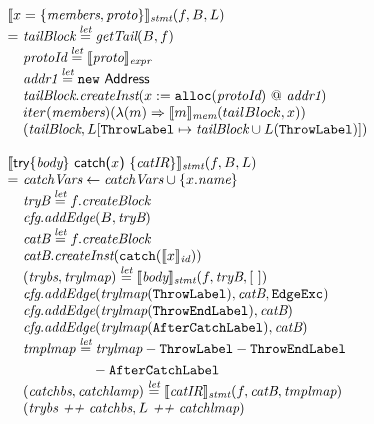 \[\begin{array}{l@{}l@{~}l}
\lefteqn{\transfun{\irobject{x}{\emph{members}, \emph{proto}}}_{\emph{stmt}}(f, B, L)}\\
& = & \emph{tailBlock} \letval \getTail(B, f)\\
& & \emph{protoId} \letval \transfun{\emph{proto}}_{\emph{expr}}\\
& & \emph{addr1} \letval \new\ \Address\\
& & \emph{tailBlock}.\emph{createInst}(x := \TT{alloc}(\emph{protoId}) ~@~ \emph{addr1})\\
& & iter(\emph{members})(\lambda(m) \Rightarrow \transfun{m}_{\emph{mem}}(tailBlock, x))\\
& & (\emph{tailBlock}, L[\ThrowLabel \mapsto \emph{tailBlock} \cup L(\ThrowLabel)])\\
& & \\

\lefteqn{\transfun{\ircfgtrycat{\emph{body}}{x}{\emph{catIR}}}_{\emph{stmt}}(f, B, L)}\\
& = & \emph{catchVars} \leftarrow \emph{catchVars} \cup \{ x.\emph{name} \}\\
& & \emph{tryB} \letval f.\emph{createBlock}\\
& & \emph{cfg}.\emph{addEdge}(B, \emph{tryB})\\
& & \emph{catB} \letval f.\emph{createBlock}\\
& & \emph{catB}.\emph{createInst}(\TT{catch}(\transfun{x}_{\emph{id}}))\\
& & (\emph{trybs}, \emph{trylmap}) \letval \transfun{\emph{body}}_{\emph{stmt}}(f, \emph{tryB}, [\ ])\\
& & \emph{cfg}.\emph{addEdge}(\emph{trylmap}(\ThrowLabel), \emph{catB}, \EdgeExc)\\
& & \emph{cfg}.\emph{addEdge}(\emph{trylmap}(\ThrowEndLabel), \emph{catB})\\
& & \emph{cfg}.\emph{addEdge}(\emph{trylmap}(\AfterCatchLabel), \emph{catB})\\
& & \emph{tmplmap} \letval \emph{trylmap} - \ThrowLabel - \ThrowEndLabel\\
&& \phantom{\emph{tmplmap} \letval} - \AfterCatchLabel\\
& & (\emph{catchbs}, \emph{catchlamp}) \letval \transfun{\emph{catIR}}_{\emph{stmt}}(f, \emph{catB}, \emph{tmplmap})\\
& & (\emph{trybs} ~\emph{++}~ \emph{catchbs}, L ~\emph{++}~ \emph{catchlmap})\\
\end{array}
\]

